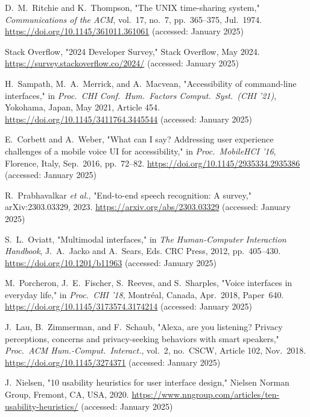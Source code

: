 \documentclass[a4paper,12pt]{article}
\begin{document}
\clearpage
\begin{thebibliography}{30}\itemsep-4pt\parsep-4pt\vspace{-2pt}
 D.~M.~Ritchie and K.~Thompson, "The UNIX time-sharing system," \textit{Communications of the ACM}, vol.~17, no.~7, pp.~365--375, Jul.~1974. \url{https://doi.org/10.1145/361011.361061} (accessed: January 2025)

 Stack Overflow, "2024 Developer Survey," Stack Overflow, May 2024. \url{https://survey.stackoverflow.co/2024/} (accessed: January 2025)

 H.~Sampath, M.~A.~Merrick, and A.~Macvean, "Accessibility of command-line interfaces," in \textit{Proc.~CHI Conf.~Hum.~Factors Comput.~Syst.~(CHI '21)}, Yokohama, Japan, May 2021, Article 454. \url{https://doi.org/10.1145/3411764.3445544} (accessed: January 2025)



 E.~Corbett and A.~Weber, "What can I say? Addressing user experience challenges of a mobile voice UI for accessibility," in \textit{Proc.~MobileHCI '16}, Florence, Italy, Sep.~2016, pp.~72--82. \url{https://doi.org/10.1145/2935334.2935386} (accessed: January 2025)

 R.~Prabhavalkar \textit{et al.}, "End-to-end speech recognition: A survey," arXiv:2303.03329, 2023. \url{https://arxiv.org/abs/2303.03329} (accessed: January 2025)

 S.~L.~Oviatt, "Multimodal interfaces," in \textit{The Human-Computer Interaction Handbook}, J.~A.~Jacko and A.~Sears, Eds. CRC Press, 2012, pp.~405--430. \url{https://doi.org/10.1201/b11963} (accessed: January 2025)

 M.~Porcheron, J.~E.~Fischer, S.~Reeves, and S.~Sharples, "Voice interfaces in everyday life," in \textit{Proc.~CHI '18}, Montréal, Canada, Apr.~2018, Paper~640. \url{https://doi.org/10.1145/3173574.3174214} (accessed: January 2025)

 J.~Lau, B.~Zimmerman, and F.~Schaub, "Alexa, are you listening? Privacy perceptions, concerns and privacy-seeking behaviors with smart speakers," \textit{Proc.~ACM Hum.-Comput.~Interact.}, vol.~2, no.~CSCW, Article 102, Nov.~2018. \url{https://doi.org/10.1145/3274371} (accessed: January 2025)

 J.~Nielsen, "10 usability heuristics for user interface design," Nielsen Norman Group, Fremont, CA, USA, 2020. \url{https://www.nngroup.com/articles/ten-usability-heuristics/} (accessed: January 2025)


\end{thebibliography}
\end{document}
